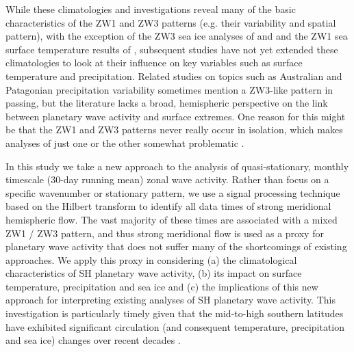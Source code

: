 While these climatologies and investigations reveal many of the basic characteristics of the ZW1 and ZW3 patterns (e.g. their variability and spatial pattern), with the exception of the ZW3 sea ice analyses of \citet{Raphael2007} and \citet{Yuan2008} and the ZW1 sea surface temperature results of \citet{Hobbs2007}, subsequent studies have not yet extended these climatologies to look at their influence on key variables such as surface temperature and precipitation. Related studies on topics such as Australian \citep{Frederiksen2014} and Patagonian \citep{Garreaud2013} precipitation variability sometimes mention a ZW3-like pattern in passing, but the literature lacks a broad, hemispheric perspective on the link between planetary wave activity and surface extremes. One reason for this might be that the ZW1 and ZW3 patterns never really occur in isolation, which makes analyses of just one or the other somewhat problematic \citep{Hobbs2010}.

In this study we take a new approach to the analysis of quasi-stationary, monthly timescale (30-day running mean) zonal wave activity. Rather than focus on a specific wavenumber or stationary pattern, we use a signal processing technique based on the Hilbert transform to identify all data times of strong meridional hemispheric flow. The vast majority of these times are associated with a mixed ZW1 / ZW3 pattern, and thus strong meridional flow is used as a proxy for planetary wave activity that does not suffer many of the shortcomings of existing approaches. We apply this proxy in considering (a) the climatological characteristics of SH planetary wave activity, (b) its impact on surface temperature, precipitation and sea ice and (c) the implications of this new approach for interpreting existing analyses of SH planetary wave activity. This investigation is particularly timely given that the mid-to-high southern latitudes have exhibited significant circulation (and consequent temperature, precipitation and sea ice) changes over recent decades \citep[e.g.][]{Bromwich2013,Burgener2013,Simmonds2015}. 
